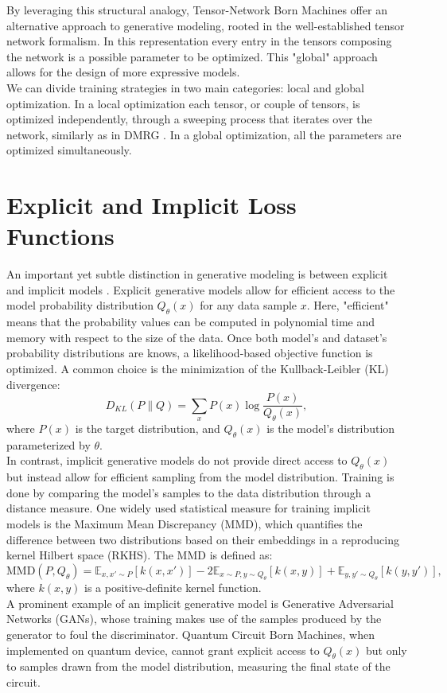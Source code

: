 By leveraging this structural analogy, Tensor-Network Born Machines offer an alternative approach to generative modeling, rooted in the well-established tensor network formalism. In this representation every entry in the tensors composing the network is a possible parameter to be optimized. This "global" approach allows for the design of more expressive models. \\

We can divide training strategies in two main categories: local and global optimization. In a local optimization each tensor, or couple of tensors, is optimized independently, through a sweeping process that iterates over the network, similarly as in DMRG \cite{han_unsupervised_2018} \cite{schollwock_density-matrix_2011}. In a global optimization, all the parameters are optimized simultaneously.

\section{Explicit and Implicit Loss Functions}

An important yet subtle distinction in generative modeling is between explicit and implicit models \cite{rudolph_trainability_2024}. Explicit generative models allow for efficient access to the model probability distribution \( Q_\theta(x) \) for any data sample \( x \). Here, "efficient" means that the probability values can be computed in polynomial time and memory with respect to the size of the data. Once both model's and dataset's probability distributions are knows, a likelihood-based objective function is optimized. A common choice is the minimization of the Kullback-Leibler (KL) divergence:
\[
D_{KL}(P \| Q) = \sum_x P(x) \log \frac{P(x)}{Q_\theta(x)},
\]
where \( P(x) \) is the target distribution, and \( Q_\theta(x) \) is the model's distribution parameterized by \( \theta \).\\
In contrast, implicit generative models do not provide direct access to \( Q_\theta(x) \) but instead allow for efficient sampling from the model distribution. Training is done by comparing the model's samples to the data distribution through a distance measure.
One widely used statistical measure for training implicit models is the Maximum Mean Discrepancy (MMD), which quantifies the difference between two distributions based on their embeddings in a reproducing kernel Hilbert space (RKHS). The MMD is defined as:
\[
\text{MMD}(P, Q_\theta) = \mathbb{E}_{x, x' \sim P}[k(x, x')] - 2\mathbb{E}_{x \sim P, y \sim Q_\theta}[k(x, y)] + \mathbb{E}_{y, y' \sim Q_\theta}[k(y, y')],
\]
where \( k(x, y) \) is a positive-definite kernel function. \\
A prominent example of an implicit generative model is Generative Adversarial Networks (GANs), whose training makes use of the samples produced by the generator to foul the discriminator.
Quantum Circuit Born Machines, when implemented on quantum device, cannot grant explicit access to \( Q_\theta(x) \) but only to samples drawn from the model distribution, measuring the final state of the circuit.

